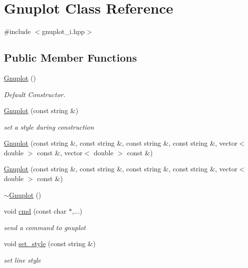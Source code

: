 \hypertarget{class_gnuplot}{}\section{Gnuplot Class Reference}
\label{class_gnuplot}


{\ttfamily \#include $<$gnuplot\+\_\+i.\+hpp$>$}

\subsection*{Public Member Functions}
\begin{DoxyCompactItemize}
\item 
\mbox{\hyperlink{class_gnuplot_a936d27de7b6f57d1f3d61491dc70f1ae}{Gnuplot}} ()
\begin{DoxyCompactList}\small\item\em Default Constructor. \end{DoxyCompactList}\item 
\mbox{\hyperlink{class_gnuplot_a4acdc327a6a9eb3c4ab3f37814dce26e}{Gnuplot}} (const string \&)
\begin{DoxyCompactList}\small\item\em set a style during construction \end{DoxyCompactList}\item 
\mbox{\hyperlink{class_gnuplot_ab777a09e0527b64f3980788f73400257}{Gnuplot}} (const string \&, const string \&, const string \&, const string \&, vector$<$ double $>$ const \&, vector$<$ double $>$ const \&)
\item 
\mbox{\hyperlink{class_gnuplot_a7c87a9e55a3cdc5c559d07744d9856f8}{Gnuplot}} (const string \&, const string \&, const string \&, const string \&, vector$<$ double $>$ const \&)
\item 
\mbox{\hyperlink{class_gnuplot_a78a68f621caa87d1f34324fcd093c7bd}{$\sim$\+Gnuplot}} ()
\item 
void \mbox{\hyperlink{class_gnuplot_a6f299285af0a0ee2cf1722c469aa1a57}{cmd}} (const char $\ast$,...)
\begin{DoxyCompactList}\small\item\em send a command to gnuplot \end{DoxyCompactList}\item 
void \mbox{\hyperlink{class_gnuplot_accdd7b69237ead4109c74e1e440c185f}{set\+\_\+style}} (const string \&)
\begin{DoxyCompactList}\small\item\em set line style \end{DoxyCompactList}\item 

\end{DoxyCompactItemize}
